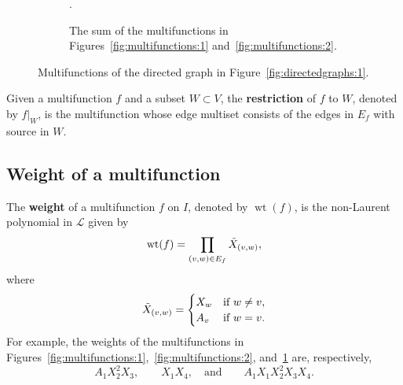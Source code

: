 \documentclass[11pt]{article}
\theoremstyle{definition}
\numberwithin{equation}{section}
\newcommand{\vocab}[1]{\textbf{#1}}
\newcommand{\edges}{E}
\newcommand{\laurentpolynomialring}{\mathcal{L}}
\DeclareMathOperator{\weight}{wt}
\begin{document}
\begin{figure}[htpb]
    \hfill
    \begin{subfigure}[t]{0.29\textwidth}
        \centering
        .
        \caption{The sum of the multifunctions in Figures~\ref{fig:multifunctions:1} and~\ref{fig:multifunctions:2}.}
        \label{fig:multifunctions:3}
    \end{subfigure}
    \caption{Multifunctions of the directed graph in Figure~\ref{fig:directedgraphs:1}.}
    \label{fig:multifunctions}
\end{figure}

Given a multifunction \(f\) and a subset \(W \subset V\),
the \vocab{restriction} of \(f\) to \(W\), denoted by \(f|_{W}\), is the multifunction whose edge multiset consists of the edges in \(\edges_f\) with source in \(W\).

\subsection{Weight of a multifunction} \label{subsection:weightofamultifunction}

The \vocab{weight} of a multifunction \(f\) on \(I\), denoted by \(\weight(f)\), is the non-Laurent polynomial in \(\laurentpolynomialring\) given by
\begin{equation*}
    \weight(f)
    = \prod_{(v, w) \in \edges_f} \Tilde{X}_{(v, w)},
\end{equation*}
where
\begin{equation*}
    \Tilde{X}_{(v, w)} = 
    \begin{cases}
    X_{w} & \text{if } w \neq v, \\
    A_{v} & \text{if } w = v.
    \end{cases}
\end{equation*}
For example,
the weights of the multifunctions in Figures~\ref{fig:multifunctions:1},~\ref{fig:multifunctions:2}, and~\ref{fig:multifunctions:3} are, respectively,
\begin{equation*}
    A_1 X_2^2 X_3,
    \qquad
    X_1 X_4,
    \quad
    \text{and}
    \qquad
    A_1 X_1 X_2^2 X_3 X_4.
\end{equation*}
\end{document}
